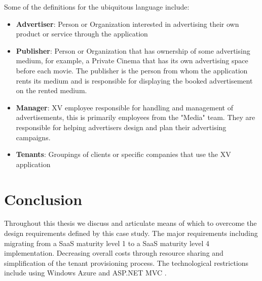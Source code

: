 Some of the definitions for the ubiquitous language include: 
\begin{itemize}
\item \textbf{Advertiser}: Person or Organization interested in advertising their own product or service through the application
\item \textbf{Publisher}: Person or Organization that has ownership of some advertising medium, for example, a Private Cinema that has its own advertising space before each movie. The publisher is the person from whom the application rents its medium and is responsible for displaying the booked advertisement on the rented medium. 
\item \textbf{Manager}: XV employee responsible for handling and management of advertisements, this is primarily employees from the "Media" team. They are responsible for helping advertisers design and plan their advertising campaigns.
\item \textbf{Tenants}: Groupings of clients or specific companies that use the XV application
\end{itemize}	


\section{Conclusion}

Throughout this thesis we discuss and articulate means of which to overcome the design requirements defined by this case study. The major requirements including migrating from a SaaS maturity level 1 to a SaaS maturity level 4 implementation. Decreasing overall costs through resource sharing and simplification of the tenant provisioning process. The technological restrictions include using Windows Azure and ASP.NET MVC .